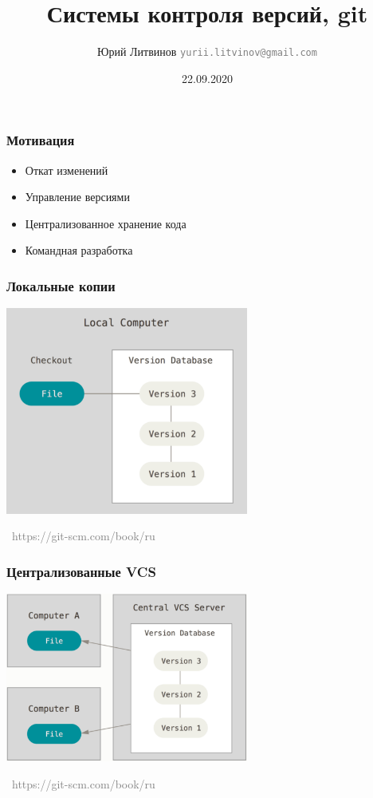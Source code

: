 \documentclass[xetex,mathserif,serif]{beamer}
\title{Системы контроля версий, git}
\author[Юрий Литвинов]{Юрий Литвинов \newline \textcolor{gray}{\small\texttt{yurii.litvinov@gmail.com}}}
\date{22.09.2020}
\newcommand{\attribution}[1] {
	\vspace{-5mm}\begin{flushright}\begin{scriptsize}\textcolor{gray}{\textcopyright\, #1}\end{scriptsize}\end{flushright}
}
\begin{document}
	
	\frame{\titlepage}
	
	\begin{frame}
		\frametitle{Мотивация}
		\begin{itemize}
			\item Откат изменений
			\item Управление версиями
			\item Централизованное хранение кода
			\item Командная разработка
		\end{itemize}
	\end{frame}

	\begin{frame}
		\frametitle{Локальные копии}
		\begin{center}
			\includegraphics[width=0.6\textwidth]{localCopies.png}
			\attribution{https://git-scm.com/book/ru}
		\end{center}
	\end{frame}

	\begin{frame}
		\frametitle{Централизованные VCS}
		\begin{center}
			\includegraphics[width=0.6\textwidth]{centralizedVcs.png}
			\attribution{https://git-scm.com/book/ru}
		\end{center}
	\end{frame}
\end{document}
